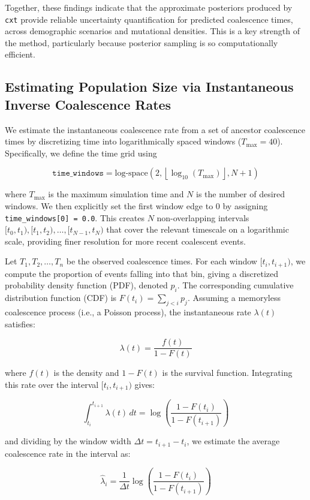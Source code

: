 \documentclass[9pt,twoside]{pnas-new}
\newcommand{\cxtkit}{\texttt{cxt}\xspace}
\newcommand{\logspace}{\text{log-space}}
\begin{document}
Together, these findings indicate that the approximate posteriors produced by \cxtkit 
provide reliable uncertainty quantification for predicted coalescence times,
across demographic scenarios and mutational densities.
This is a key strength of the method, particularly because
posterior sampling is so computationally efficient.


\subsection*{Estimating Population Size via Instantaneous Inverse Coalescence Rates}
\label{app:ne}

We estimate the instantaneous coalescence rate from a set of ancestor coalescence times by discretizing time into logarithmically spaced windows ($T_{\max}=40$). Specifically, we define the time grid using

\[
\texttt{time\_windows} = \logspace\left(2, \left\lfloor \log_{10}(T_{\max}) \right\rfloor, N + 1 \right)
\]

where $T_{\max}$ is the maximum simulation time and $N$ is the number of desired windows. 
We then explicitly set the first window edge to 0 by assigning \texttt{time\_windows[0] = 0.0}. 
This creates $N$ non-overlapping intervals $[t_0, t_1), [t_1, t_2), \dots, [t_{N-1}, t_N)$ 
that cover the relevant timescale on a logarithmic scale, providing finer resolution for more recent coalescent events. 

Let $T_1, T_2, \dots, T_n$ be the observed coalescence times. 
For each window $[t_i, t_{i+1})$, we compute the proportion of events 
falling into that bin, giving a discretized probability density function (PDF), 
denoted $p_i$. The corresponding cumulative distribution function (CDF) 
is $F(t_i) = \sum_{j < i} p_j$. Assuming a memoryless coalescence process (i.e., a Poisson process), 
the instantaneous rate $\lambda(t)$ satisfies:

\[
\lambda(t) = \frac{f(t)}{1 - F(t)}
\]

where $f(t)$ is the density and $1 - F(t)$ is the survival function. 
Integrating this rate over the interval $[t_i, t_{i+1})$ gives:

\[
\int_{t_i}^{t_{i+1}} \lambda(t) \, dt = \log\left( \frac{1 - F(t_i)}{1 - F(t_{i+1})} \right)
\]

and dividing by the window width $\Delta t = t_{i+1} - t_i$, 
we estimate the average coalescence rate in the interval as:

\[
\hat{\lambda}_i = \frac{1}{\Delta t} \log\left( \frac{1 - F(t_i)}{1 - F(t_{i+1})} \right)
\]
\end{document}
